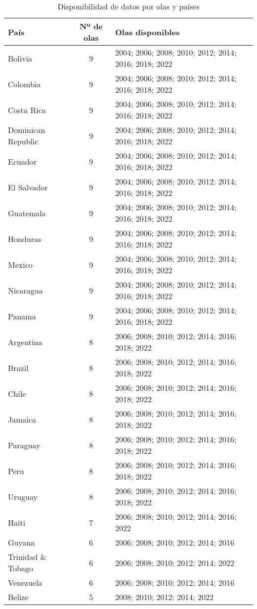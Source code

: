 \documentclass[
  letterpaper,
  DIV=11,
  numbers=noendperiod]{scrartcl}
\begin{document}
\begin{longtable}[t]{lcl}

\caption{\label{tbl-paises}Disponibilidad de datos por olas y países}

\tabularnewline

\toprule
País & Nº de olas & Olas disponibles\\
\midrule
Bolivia & 9 & 2004; 2006; 2008; 2010; 2012; 2014; 2016; 2018; 2022\\
Colombia & 9 & 2004; 2006; 2008; 2010; 2012; 2014; 2016; 2018; 2022\\
Costa Rica & 9 & 2004; 2006; 2008; 2010; 2012; 2014; 2016; 2018; 2022\\
Dominican Republic & 9 & 2004; 2006; 2008; 2010; 2012; 2014; 2016; 2018; 2022\\
Ecuador & 9 & 2004; 2006; 2008; 2010; 2012; 2014; 2016; 2018; 2022\\
\addlinespace
El Salvador & 9 & 2004; 2006; 2008; 2010; 2012; 2014; 2016; 2018; 2022\\
Guatemala & 9 & 2004; 2006; 2008; 2010; 2012; 2014; 2016; 2018; 2022\\
Honduras & 9 & 2004; 2006; 2008; 2010; 2012; 2014; 2016; 2018; 2022\\
Mexico & 9 & 2004; 2006; 2008; 2010; 2012; 2014; 2016; 2018; 2022\\
Nicaragua & 9 & 2004; 2006; 2008; 2010; 2012; 2014; 2016; 2018; 2022\\
\addlinespace
Panama & 9 & 2004; 2006; 2008; 2010; 2012; 2014; 2016; 2018; 2022\\
Argentina & 8 & 2006; 2008; 2010; 2012; 2014; 2016; 2018; 2022\\
Brazil & 8 & 2006; 2008; 2010; 2012; 2014; 2016; 2018; 2022\\
Chile & 8 & 2006; 2008; 2010; 2012; 2014; 2016; 2018; 2022\\
Jamaica & 8 & 2006; 2008; 2010; 2012; 2014; 2016; 2018; 2022\\
\addlinespace
Paraguay & 8 & 2006; 2008; 2010; 2012; 2014; 2016; 2018; 2022\\
Peru & 8 & 2006; 2008; 2010; 2012; 2014; 2016; 2018; 2022\\
Uruguay & 8 & 2006; 2008; 2010; 2012; 2014; 2016; 2018; 2022\\
Haiti & 7 & 2006; 2008; 2010; 2012; 2014; 2016; 2022\\
Guyana & 6 & 2006; 2008; 2010; 2012; 2014; 2016\\
\addlinespace
Trinidad \& Tobago & 6 & 2006; 2008; 2010; 2012; 2014; 2022\\
Venezuela & 6 & 2006; 2008; 2010; 2012; 2014; 2016\\
Belize & 5 & 2008; 2010; 2012; 2014; 2022\\
\bottomrule

\end{longtable}
\end{document}
